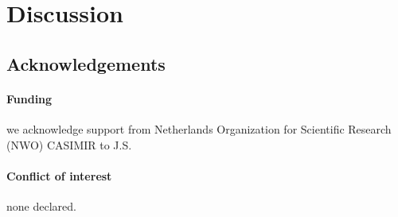 \documentclass{bioinfo}
\begin{document}
\section{Discussion}


\subsection*{Acknowledgements}
\paragraph*{Funding\textcolon} we acknowledge support from Netherlands Organization for Scientific Research (NWO) CASIMIR to J.S.
\paragraph*{Conflict of interest\textcolon} none declared.
\end{document}
